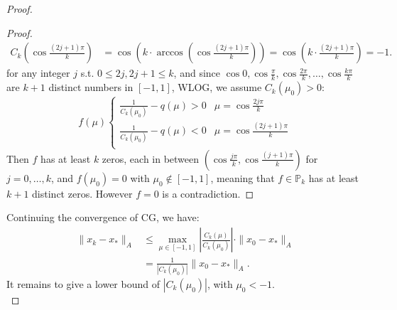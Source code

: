 \documentclass[../main/main.tex]{subfiles}
\begin{document}
\begin{proof}
\begin{proof}
\begin{align*}
  C_{k}\left(\cos \frac{(2j+1)\pi}{k} \right) &= \cos\left(k \cdot \arccos \left(\cos \frac{(2j+1)\pi}{k} \right)\right) = \cos \left(k \cdot \frac{(2j+1)\pi}{k} \right) = -1
  .\end{align*}
for any integer $j$ s.t. $0\leq 2j, 2j+1 \leq k$, and since $\cos 0, \cos \frac{\pi}{k}, \cos \frac{2\pi}{k} , \ldots, \cos \frac{k\pi}{k} $ are $k+1$ distinct numbers in $[-1,1]$, WLOG, we assume $C_{k}(\mu_{0})>0$: \[
f(\mu) \begin{cases}
\frac{1}{C_{k}(\mu_{0})} - q(\mu) > 0 & \mu = \cos \frac{2j\pi}{k}  \\
\frac{1}{C_{k}(\mu_{0})} - q(\mu) < 0 & \mu = \cos \frac{(2j+1)\pi}{k}  \\
\end{cases}
\] Then $f$ has at least $k$ zeros, each in between $\left(\cos \frac{j\pi}{k}, \cos \frac{(j+1)\pi}{k}  \right)$ for $j = 0, \ldots, k$, and $f(\mu_{0}) = 0$ with $\mu_{0}\not\in [-1,1]$, meaning that $f \in \mathbb{P}_{k}$ has at least $k+1$ distinct zeros. However $f=0$ is a contradiction.
\end{proof}
Continuing the convergence of CG, we have:
\begin{align*}
  \| x_{k}- x_{*}\|_{A} &\leq \max_{\mu \in[-1,1]}\left|\frac{C_{k}(\mu)}{C_{k}(\mu_{0})} \right|\cdot \|x_{0}-x_{*}\|_{A}\\
  &= \frac{1}{|C_{k}(\mu_{0})|}\|x_{0}-x_{*}\|_{A}
    .\end{align*} It remains to give a lower bound of $|C_{k}(\mu_{0})|$, with $\mu_{0}<-1$.\\


\end{proof}
\end{document}
